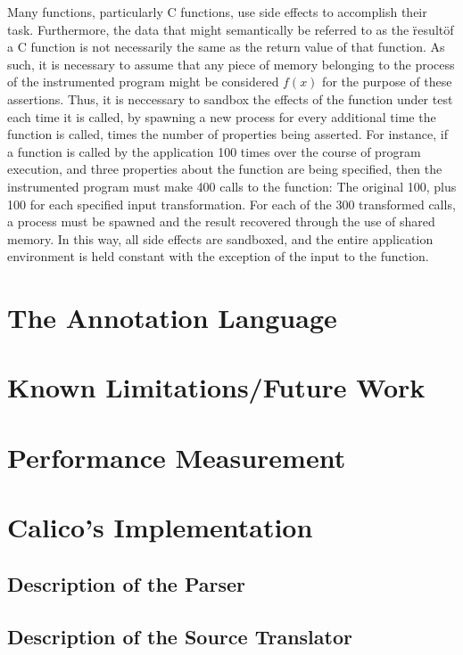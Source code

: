 \documentclass[notitlepage]{article}
\begin{document}
Many functions, particularly C functions, use side effects to accomplish their task. Furthermore, the data that might semantically be referred to as the \"result\" of a C function is not necessarily the same as the return value of that function. As such, it is necessary to assume that any piece of memory belonging to the process of the instrumented program might be considered $f(x)$ for the purpose of these assertions. Thus, it is neccessary to sandbox the effects of the function under test each time it is called, by spawning a new process for every additional time the function is called, times the number of properties being asserted. For instance, if a function is called by the application 100 times over the course of program execution, and three properties about the function are being specified, then the instrumented program must make 400 calls to the function: The original 100, plus 100 for each specified input transformation. For each of the 300 transformed calls, a process must be spawned and the result recovered through the use of shared memory. In this way, all side effects are sandboxed, and the entire application environment is held constant with the exception of the input to the function.

\section{The Annotation Language}

\section{Known Limitations/Future Work}

\section{Performance Measurement}

\section{Calico's Implementation}

\subsection{Description of the Parser}

\subsection{Description of the Source Translator}
\end{document}
